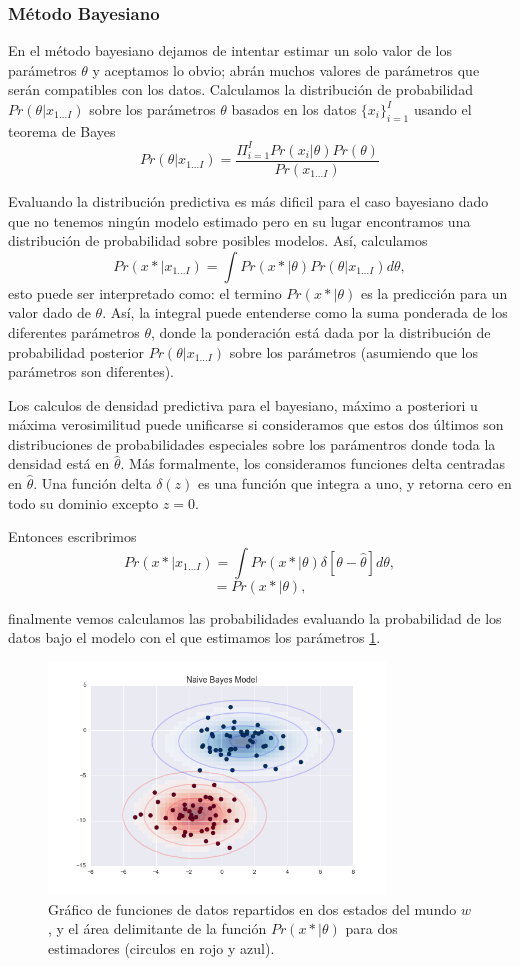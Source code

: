\documentclass[letter,12pt]{report}
\begin{document}
\subsubsection{Método Bayesiano}
En el método bayesiano \cite{Bayes, Bayes2} dejamos de intentar estimar un solo valor de los parámetros
$\theta$ y aceptamos lo obvio; abrán muchos valores de parámetros que serán
compatibles con los datos. Calculamos la distribución de probabilidad
$Pr(\theta|x_{1...I})$ sobre los parámetros $\theta$ basados en los datos
$\{x_i\}_{i=1}^I$ usando el teorema de Bayes
$$Pr(\theta|x_{1...I})=\frac{\Pi_{i=1}^I
Pr(x_i|\theta)Pr(\theta)}{Pr(x_{1...I})}$$

Evaluando la distribución predictiva es más dificil para el caso bayesiano dado que no
tenemos ningún modelo estimado pero en su lugar encontramos una distribución de
probabilidad sobre posibles modelos. Así, calculamos
$$Pr(x*|x_{1...I})=\int Pr(x*|\theta) Pr(\theta|x_{1...I})d\theta,$$
esto puede ser interpretado como: el termino $Pr(x*|\theta)$ es la predicción para un
valor dado de $\theta$. Así, la integral puede entenderse como la suma ponderada de los
diferentes parámetros $\theta$, donde la ponderación está dada por la distribución de
probabilidad posterior $Pr(\theta|x_{1...I})$ sobre los parámetros (asumiendo que
los parámetros son diferentes).

Los calculos de densidad predictiva para el bayesiano, máximo a posteriori u máxima
verosimilitud puede unificarse si consideramos que estos dos últimos son distribuciones
de probabilidades especiales sobre los parámentros donde toda la densidad está en
$\hat\theta$. Más formalmente, los consideramos funciones delta centradas en
$\hat\theta$. Una función delta $\delta(z)$ es una función que integra a uno, y retorna
cero en todo su dominio excepto $z=0$.

Entonces escribrimos
$$Pr(x*|x_{1...I})=\int Pr(x*|\theta) \delta[\theta - \hat\theta]d\theta,$$
$$=Pr(x*|\theta),$$ 

finalmente vemos calculamos las probabilidades evaluando la probabilidad de los datos
bajo el modelo con el que estimamos los parámetros \ref{fig:bayes}.

\begin{figure}[H]
    \centering
    \includegraphics[width=0.8\textwidth]{bayes}
    \caption{Gráfico de funciones de datos repartidos en dos estados del mundo $w$, y el
    área delimitante de la función $Pr(x*|\theta)$ para dos estimadores (circulos en rojo
y azul).}
    \label{fig:bayes}
\end{figure}
\end{document}
